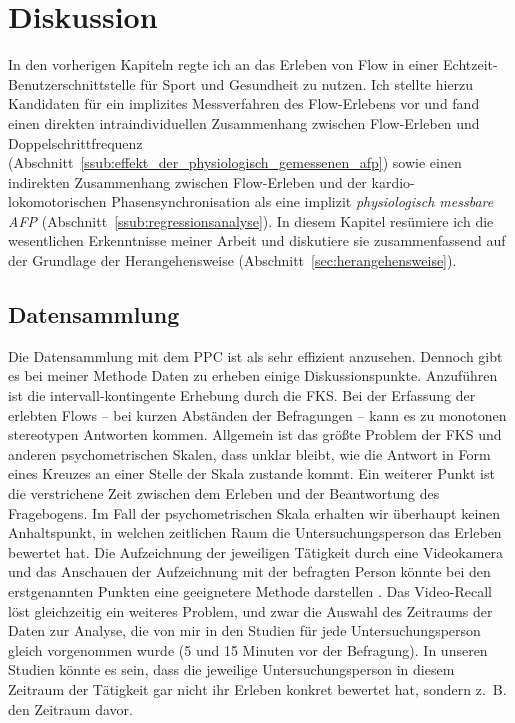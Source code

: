 

\chapter{Diskussion} \label{cha:diskussion} In den vorherigen Kapiteln regte ich an das Erleben von Flow in einer Echtzeit-Benutzerschnittstelle für Sport und Gesundheit zu nutzen. Ich stellte hierzu Kandidaten für ein implizites Messverfahren des Flow-Erlebens vor und fand einen direkten intraindividuellen Zusammenhang zwischen Flow-Erleben und Doppelschrittfrequenz (Abschnitt~\ref{ssub:effekt_der_physiologisch_gemessenen_afp}) sowie einen indirekten Zusammenhang zwischen Flow-Erleben und der kardio-lokomotorischen Phasensynchronisation als eine implizit \emph{physiologisch messbare \ac{AFP}} (Abschnitt~\ref{ssub:regressionsanalyse}). In diesem Kapitel resümiere ich die wesentlichen Erkenntnisse meiner Arbeit und diskutiere sie zusammenfassend auf der Grundlage der Herangehensweise (Abschnitt~\ref{sec:herangehensweise}). 

\section{Datensammlung} 

\label{sec:datensammlung}

Die Datensammlung mit dem \ac{PPC} ist als sehr effizient anzusehen. Dennoch gibt es bei meiner Methode Daten zu erheben einige Diskussionspunkte. Anzuführen ist die intervall-kontingente Erhebung durch die \ac{FKS}. Bei der Erfassung der erlebten Flows -- bei kurzen Abständen der Befragungen -- kann es zu monotonen stereotypen Antworten kommen. Allgemein ist das größte Problem der \ac{FKS} und anderen psychometrischen Skalen, dass unklar bleibt, wie die Antwort in Form eines Kreuzes an einer Stelle der Skala zustande kommt. Ein weiterer Punkt ist die verstrichene Zeit zwischen dem Erleben und der Beantwortung des Fragebogens. Im Fall der psychometrischen Skala erhalten wir überhaupt keinen Anhaltspunkt, in welchen zeitlichen Raum die Untersuchungsperson das Erleben bewertet hat. Die Aufzeichnung der jeweiligen Tätigkeit durch eine Videokamera und das Anschauen der Aufzeichnung mit der befragten Person könnte bei den erstgenannten Punkten eine geeignetere Methode darstellen \citep[Video-Recall,][S.~566]{Leuchter2006}. Das Video-Recall löst gleichzeitig ein weiteres Problem, und zwar die Auswahl des Zeitraums der Daten zur Analyse, die von mir in den Studien für jede Untersuchungsperson gleich vorgenommen wurde (5 und 15 Minuten vor der Befragung). In unseren Studien könnte es sein, dass die jeweilige Untersuchungsperson in diesem Zeitraum der Tätigkeit gar nicht ihr Erleben konkret bewertet hat, sondern z.~B. den Zeitraum davor. 

